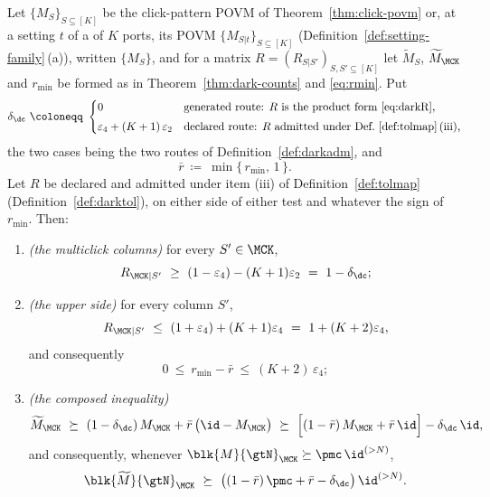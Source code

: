 \begin{proposition}\label{prop:dark-slack-bound}
Let $\{M_S\}_{S\subseteq[K]}$ be the click-pattern POVM of
Theorem~\ref{thm:click-povm} or, at a setting $t$ of a 
of $K$ ports, its POVM $\{M_{S|t}\}_{S\subseteq[K]}$
(Definition~\ref{def:setting-family}\,(a)), written $\{M_S\}$, and for a matrix $R=(R_{S|S'})_{S,S'\subseteq[K]}$ let
$\widetilde M_S$, $\widetilde M_{\MCK}$ and $r_{\min}$ be formed as in
Theorem~\ref{thm:dark-counts} and \eqref{eq:rmin}. Put
\begin{equation}\label{eq:darkdelta}
  \delta_{\dc}\ \coloneqq\
  \begin{cases}
    0
      & \text{generated route: }R\text{ is the product form }\eqref{eq:darkR},
      \\[3pt]
    \varepsilon_4+(K+1)\,\varepsilon_2
      & \text{declared route: }R\text{ admitted under
        Def.~\ref{def:tolmap}\,(iii),}
  \end{cases}
\end{equation}
the two cases being the two routes of Definition~\ref{def:darkadm}, and
\begin{equation}\label{eq:rbar}
  \bar r\ \coloneqq\ \min\{\,r_{\min},\,1\,\} .
\end{equation}
Let $R$ be declared and admitted under item (iii) of
Definition~\ref{def:tolmap} (Definition~\ref{def:darktol}), on either side of
either test and whatever the sign of $r_{\min}$. Then:
\begin{enumerate}[label=(\roman*),leftmargin=3.0em]
\item \emph{(the multiclick columns)} for every $S'\in\MCK$,
  \begin{equation}\label{eq:d2slack}
    R_{\MCK|S'}\ \ge\ (1-\varepsilon_4)-(K+1)\varepsilon_2\ =\ 1-\delta_{\dc} ;
  \end{equation}
\item \emph{(the upper side)} for every column $S'$,
  \begin{equation}\label{eq:rminupper}
    R_{\MCK|S'}\ \le\ (1+\varepsilon_4)+(K+1)\varepsilon_4\ =\ 1+(K+2)\varepsilon_4 ,
  \end{equation}
  and consequently
  \begin{equation}\label{eq:rbarcost}
    0\ \le\ r_{\min}-\bar r\ \le\ (K+2)\,\varepsilon_4 ;
  \end{equation}
\item \emph{(the composed inequality)}
  \begin{equation}\label{eq:darkimproveslack}
    \widetilde M_{\MCK}\ \succeq\
    (1-\delta_{\dc})\,M_{\MCK}+\bar r\,\big(\id-M_{\MCK}\big)
    \ \succeq\ \Big[(1-\bar r)\,M_{\MCK}+\bar r\,\id\Big]-\delta_{\dc}\,\id ,
  \end{equation}
  and consequently, whenever $\blk{M}{\gtN}_{\MCK}\succeq\pmc\,\id^{(>N)}$,
  \begin{equation}\label{eq:darkpmcslack}
    \blk{\widetilde M}{\gtN}_{\MCK}\ \succeq\
    \big((1-\bar r)\,\pmc+\bar r-\delta_{\dc}\big)\,\id^{(>N)} .
  \end{equation}
\end{enumerate}
\end{proposition}

